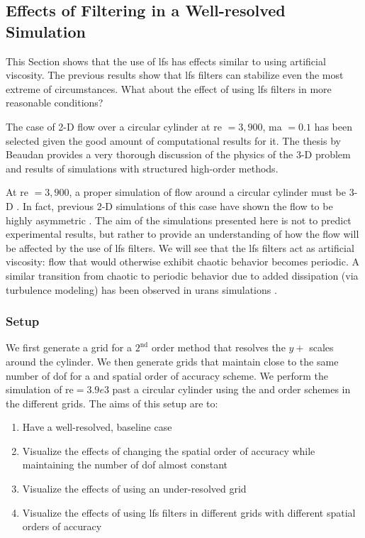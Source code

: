 \subsection{Effects of Filtering in a Well-resolved Simulation}
\label{sec:filteringEffects}

This Section shows that the use of \gls{lfs} has effects similar to using artificial viscosity. The previous results show that \gls{lfs} filters can stabilize even the most extreme of circumstances. What about the effect of using \gls{lfs} filters in more reasonable conditions?

The case of 2-D flow over a circular cylinder at \gls{re} $=3,900$, \gls{ma} $=0.1$ has been selected given the good amount of computational results for it. The thesis by Beaudan \cite{beaudan1994numerical} provides a very thorough discussion of the physics of the 3-D problem and results of simulations with structured high-order methods.

At \gls{re} $=3,900$, a proper simulation of flow around a circular cylinder must be 3-D \cite{breuer1998large}. In fact, previous 2-D simulations of this case have shown the flow to be highly asymmetric \cite{breuer1998large}. The aim of the simulations presented here is not to predict experimental results, but rather to provide an understanding of how the flow will be affected by the use of \gls{lfs} filters. We will see that the \gls{lfs} filters act as artificial viscosity: flow that would otherwise exhibit chaotic behavior becomes periodic. A similar transition from chaotic to periodic behavior due to added dissipation (via turbulence modeling) has been observed in \gls{urans} simulations \cite{catalano2003numerical}.

\subsubsection{Setup}
\label{sec:filterEffectsSetup}

We first generate a grid for a $2^{\mathrm{nd}}$ order method that resolves the $y+$ scales around the cylinder. We then generate grids that maintain close to the same number of \gls{dof} for a   and  spatial order of accuracy scheme. We perform the simulation of \gls{re}$=3.9e3$ past a circular cylinder using the  and  order schemes in the different grids. The aims of this setup are to:
\begin{enumerate}
\item Have a well-resolved, baseline case
\item Visualize the effects of changing the spatial order of accuracy while maintaining the number of \gls{dof} almost constant
\item Visualize the effects of using an under-resolved grid
\item Visualize the effects of using \gls{lfs} filters in different grids with different spatial orders of accuracy
\end{enumerate}

